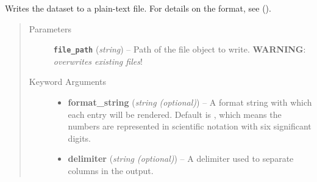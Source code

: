 \documentclass[a4paper,10pt,english]{sphinxmanual}
\begin{document}
\begin{fulllineitems}
\begin{fulllineitems}
\begin{quote}
\begin{description}
\end{description}\end{quote}

\end{fulllineitems}


\begin{fulllineitems}
\label{index:kafe.dataset.Dataset.write_formatted}
Writes the dataset to a plain-text file. For details on the format, see
{\hyperref[index:kafe.dataset.Dataset.read_from_file]{\emph{}}} ().
\begin{quote}\begin{description}
\item[{Parameters}] \leavevmode
\textbf{\texttt{file\_path}} (\emph{string}) -- Path of the file object to write. \textbf{WARNING}: \emph{overwrites existing
files}!

\item[{Keyword Arguments}] \leavevmode\begin{itemize}
\item {} 
\textbf{format\_string} (\emph{string (optional)}) --
A format string with which each entry will be rendered. Default is
, which means the numbers are represented in scientific
notation with six significant digits.

\item {} 
\textbf{delimiter} (\emph{string (optional)}) --
A delimiter used to separate columns in the output.

\end{itemize}

\end{description}\end{quote}

\end{fulllineitems}


\end{fulllineitems}

\end{document}
